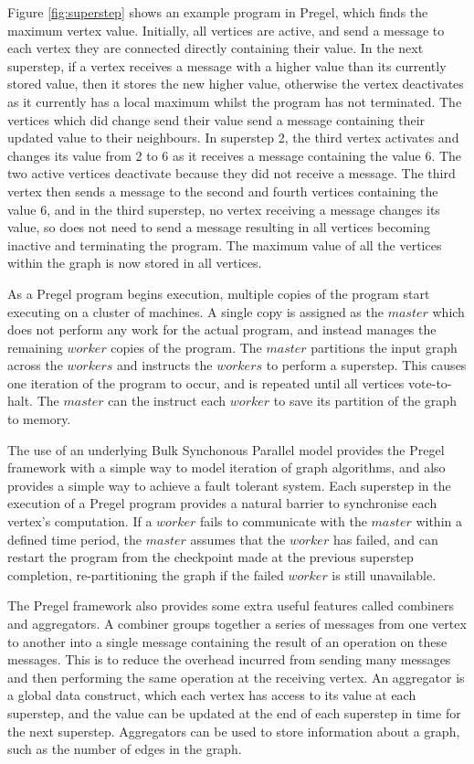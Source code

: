 Figure \ref{fig:superstep} shows an example program in Pregel, which finds the maximum vertex value. Initially, all vertices are active, and send a message to each vertex they are connected directly containing their value. In the next superstep, if a vertex receives a message with a higher value than its currently stored value, then it stores the new higher value, otherwise the vertex deactivates as it currently has a local maximum whilst the program has not terminated. The vertices which did change send their value send a message containing their updated value to their neighbours. In superstep 2, the third vertex activates and changes its value from 2 to 6 as it receives a message containing the value 6. The two active vertices deactivate because they did not receive a message. The third vertex then sends a message to the second and fourth vertices containing the value 6, and in the third superstep, no vertex receiving a message changes its value, so does not need to send a message resulting in all vertices becoming inactive and terminating the program. The maximum value of all the vertices within the graph is now stored in all vertices.

As a Pregel program begins execution, multiple copies of the program start executing on a cluster of machines. A single copy is assigned as the $master$ which does not perform any work for the actual program, and instead manages the remaining $worker$ copies of the program. The $master$ partitions the input graph across the $workers$ and instructs the $workers$ to perform a superstep. This causes one iteration of the program to occur, and is repeated until all vertices vote-to-halt. The $master$ can the instruct each $worker$ to save its partition of the graph to memory.

The use of an underlying Bulk Synchonous Parallel model provides the Pregel framework with a simple way to model iteration of graph algorithms, and also provides a simple way to achieve a fault tolerant system. Each superstep in the execution of a Pregel program provides a natural barrier to synchronise each vertex's computation. If a $worker$ fails to communicate with the $master$ within a defined time period, the $master$ assumes that the $worker$ has failed, and can restart the program from the checkpoint made at the previous superstep completion, re-partitioning the graph if the failed $worker$ is still unavailable.

The Pregel framework also provides some extra useful features called combiners and aggregators. A combiner groups together a series of messages from one vertex to another into a single message containing the result of an operation on these messages. This is to reduce the overhead incurred from sending many messages and then performing the same operation at the receiving vertex. An aggregator is a global data construct, which each vertex has access to its value at each superstep, and the value can be updated at the end of each superstep in time for the next superstep. Aggregators can be used to store information about a graph, such as the number of edges in the graph.

